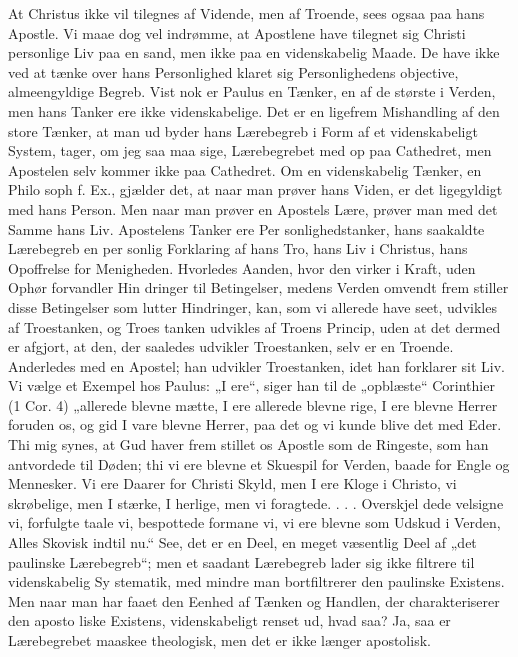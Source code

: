 \documentclass[12pt]{book}
\newcommand{\opage}[1]{\marginnote{\footnotesize\textit{[#1]}}}
\begin{document}
At Christus ikke vil tilegnes af Vidende, men af Troende,
sees ogsaa paa hans Apostle. Vi maae dog vel indrømme, at
Apostlene have tilegnet sig Christi personlige Liv paa en
\opage{78}\setcounter{footnote}{0}%
sand, men ikke paa en videnskabelig Maade. De have
ikke ved at tænke over hans Personlighed klaret sig
Personlighedens objective, almeengyldige Begreb. Vist\-%
nok er Paulus en Tænker, en af de største i Verden,
men hans Tanker ere ikke videnskabelige. Det er en
ligefrem Mishandling af den store Tænker, at man ud\-%
byder hans Lærebegreb i Form af et videnskabeligt
System, tager, om jeg saa maa sige, Lærebegrebet med
op paa Cathedret, men Apostelen selv kommer ikke
paa Cathedret. Om en videnskabelig Tænker, en Philo\-%
soph f. Ex., gjælder det, at naar man prøver hans
Viden, er det ligegyldigt med hans Person. Men
naar man prøver en Apostels Lære, prøver man med
det Samme hans Liv. Apostelens Tanker ere Per\-%
sonlighedstanker, hans saakaldte Lærebegreb en per\-%
sonlig Forklaring af hans Tro, hans Liv i Christus,
hans Opoffrelse for Menigheden. Hvorledes Aanden,
hvor den virker i Kraft, uden Ophør forvandler Hin\-%
dringer til Betingelser, medens Verden omvendt frem\-%
stiller disse Betingelser som lutter Hindringer, kan, som
vi allerede have seet, udvikles af Troestanken, og Troes\-%
tanken udvikles af Troens Princip, uden at det dermed
er afgjort, at den, der saaledes udvikler Troestanken,
selv er en Troende. Anderledes med en Apostel; han
udvikler Troestanken, idet han forklarer sit Liv. Vi
vælge et Exempel hos Paulus: „I ere“, siger han til de
„opblæste“ Corinthier (1 Cor. 4) „allerede blevne mætte, I
ere allerede blevne rige, I ere blevne Herrer foruden os,
og gid I vare blevne Herrer, paa det og vi kunde blive
det med Eder. Thi mig synes, at Gud haver frem\-%
stillet os Apostle som de Ringeste, som han antvordede
til Døden; thi vi ere blevne et Skuespil for Verden,
baade for Engle og Mennesker. Vi ere Daarer for
Christi Skyld, men I ere Kloge i Christo, vi skrøbelige,
\opage{79}\setcounter{footnote}{0}%
men I stærke, I herlige, men vi foragtede. . . . Overskjel\-%
dede velsigne vi, forfulgte taale vi, bespottede formane
vi, vi ere blevne som Udskud i Verden, Alles Skovisk
indtil nu.“ See, det er en Deel, en meget væsentlig
Deel af „det paulinske Lærebegreb“; men et saadant
Lærebegreb lader sig ikke filtrere til videnskabelig Sy\-%
stematik, med mindre man bortfiltrerer den paulinske
Existens. Men naar man har faaet den Eenhed af
Tænken og Handlen, der charakteriserer den aposto\-%
liske Existens, videnskabeligt renset ud, hvad saa? Ja,
saa er Lærebegrebet maaskee theologisk, men det er
ikke længer apostolisk.
\end{document}
